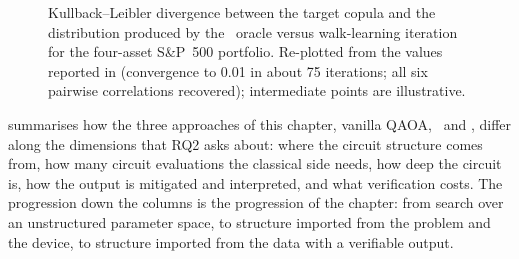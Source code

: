 \begin{figure}[htbp]
\centering
{}
\caption{Kullback--Leibler divergence between the target copula and the distribution produced by the \qawa\ oracle versus walk-learning iteration for the four-asset S\&P~500 portfolio. Re-plotted from the values reported in \cite{guo2025qawa} (convergence to 0.01 in about 75 iterations; all six pairwise correlations recovered); intermediate points are illustrative.}
\label{fig:nisq:qawa-kl}
\end{figure}

 summarises how the three approaches of this chapter, vanilla QAOA, \deal\ and \qawa, differ along the dimensions that RQ2 asks about: where the circuit structure comes from, how many circuit evaluations the classical side needs, how deep the circuit is, how the output is mitigated and interpreted, and what verification costs. The progression down the columns is the progression of the chapter: from search over an unstructured parameter space, to structure imported from the problem and the device, to structure imported from the data with a verifiable output.

